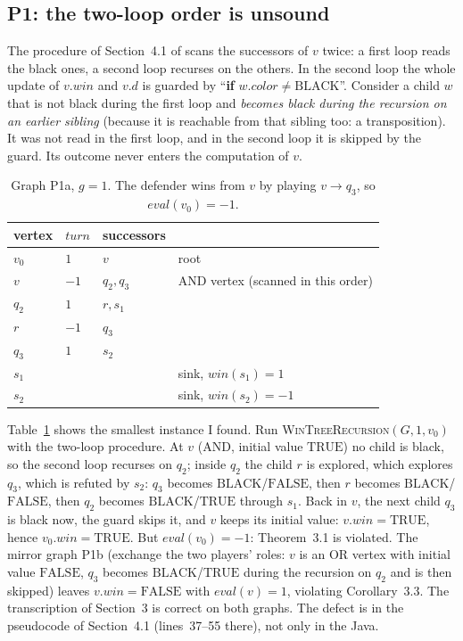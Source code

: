 \documentclass{article}
\theoremstyle{plain}
\theoremstyle{definition}
\theoremstyle{remark}
\newcommand{\eval}{\mathit{eval}}
\newcommand{\turn}{\mathit{turn}}
\newcommand{\win}{\mathit{win}}
\newcommand{\col}{\mathit{color}}
\newcommand{\TRUE}{\ensuremath{\mathrm{TRUE}}}
\newcommand{\FALSE}{\ensuremath{\mathrm{FALSE}}}
\newcommand{\BLACK}{\ensuremath{\mathrm{BLACK}}}
\newcommand{\WTR}{\textsc{WinTreeRecursion}}
\begin{document}
\subsection{P1: the two-loop order is unsound}\label{sec:p1}

The procedure of Section~4.1 of \cite{romano2026} scans the successors of $v$ twice: a first loop reads the black ones, a second loop recurses on the others. In the second loop the whole update of $v.\win$ and $v.d$ is guarded by ``\textbf{if} $w.\col \neq \BLACK$''. Consider a child $w$ that is not black during the first loop and \emph{becomes black during the recursion on an earlier sibling} (because it is reachable from that sibling too: a transposition). It was not read in the first loop, and in the second loop it is skipped by the guard. Its outcome never enters the computation of $v$.

\begin{table}[h]\centering\small
\begin{tabular}{llll}
\toprule
vertex & $\turn$ & successors & \\
\midrule
$v_0$ & $1$ & $v$ & root \\
$v$ & $-1$ & $q_2, q_3$ & AND vertex (scanned in this order) \\
$q_2$ & $1$ & $r, s_1$ & \\
$r$ & $-1$ & $q_3$ & \\
$q_3$ & $1$ & $s_2$ & \\
$s_1$ & & & sink, $\win(s_1) = 1$ \\
$s_2$ & & & sink, $\win(s_2) = -1$ \\
\bottomrule
\end{tabular}
\caption{Graph P1a, $g = 1$. The defender wins from $v$ by playing $v \to q_3$, so $\eval(v_0) = -1$.}
\label{tab:p1a}
\end{table}

Table~\ref{tab:p1a} shows the smallest instance I found. Run \WTR{}$(G, 1, v_0)$ with the two-loop procedure. At $v$ (AND, initial value \TRUE{}) no child is black, so the second loop recurses on $q_2$; inside $q_2$ the child $r$ is explored, which explores $q_3$, which is refuted by $s_2$: $q_3$ becomes \BLACK{}/\FALSE{}, then $r$ becomes \BLACK{}/\FALSE{}, then $q_2$ becomes \BLACK{}/\TRUE{} through $s_1$. Back in $v$, the next child $q_3$ is black now, the guard skips it, and $v$ keeps its initial value: $v.\win = \TRUE$, hence $v_0.\win = \TRUE$. But $\eval(v_0) = -1$: Theorem~3.1 is violated. The mirror graph P1b (exchange the two players' roles: $v$ is an OR vertex with initial value \FALSE{}, $q_3$ becomes \BLACK{}/\TRUE{} during the recursion on $q_2$ and is then skipped) leaves $v.\win = \FALSE$ with $\eval(v) = 1$, violating Corollary~3.3. The transcription of Section~3 is correct on both graphs. The defect is in the pseudocode of Section~4.1 (lines~37--55 there), not only in the Java.
\end{document}
